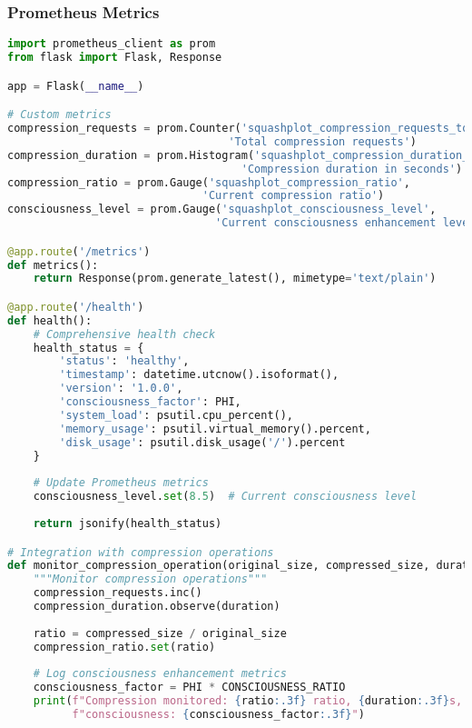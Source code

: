 \documentclass[11pt,a4paper]{article}
\begin{document}
\subsubsection{Prometheus Metrics}

\begin{lstlisting}[language=Python, caption=Enterprise Monitoring Integration]
import prometheus_client as prom
from flask import Flask, Response

app = Flask(__name__)

# Custom metrics
compression_requests = prom.Counter('squashplot_compression_requests_total', 
                                  'Total compression requests')
compression_duration = prom.Histogram('squashplot_compression_duration_seconds', 
                                    'Compression duration in seconds')
compression_ratio = prom.Gauge('squashplot_compression_ratio', 
                              'Current compression ratio')
consciousness_level = prom.Gauge('squashplot_consciousness_level', 
                                'Current consciousness enhancement level')

@app.route('/metrics')
def metrics():
    return Response(prom.generate_latest(), mimetype='text/plain')

@app.route('/health')
def health():
    # Comprehensive health check
    health_status = {
        'status': 'healthy',
        'timestamp': datetime.utcnow().isoformat(),
        'version': '1.0.0',
        'consciousness_factor': PHI,
        'system_load': psutil.cpu_percent(),
        'memory_usage': psutil.virtual_memory().percent,
        'disk_usage': psutil.disk_usage('/').percent
    }
    
    # Update Prometheus metrics
    consciousness_level.set(8.5)  # Current consciousness level
    
    return jsonify(health_status)

# Integration with compression operations
def monitor_compression_operation(original_size, compressed_size, duration):
    """Monitor compression operations"""
    compression_requests.inc()
    compression_duration.observe(duration)
    
    ratio = compressed_size / original_size
    compression_ratio.set(ratio)
    
    # Log consciousness enhancement metrics
    consciousness_factor = PHI * CONSCIOUSNESS_RATIO
    print(f"Compression monitored: {ratio:.3f} ratio, {duration:.3f}s, "
          f"consciousness: {consciousness_factor:.3f}")
\end{lstlisting}
\end{document}
